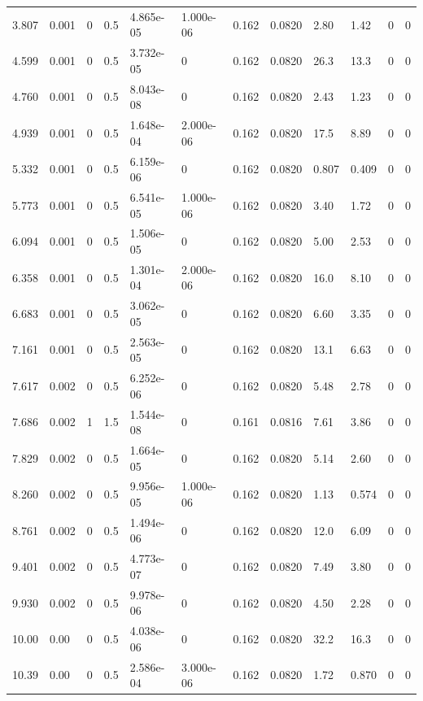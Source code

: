 \documentclass[preview]{standalone}
\begin{document}
{{\begin{tabular}{L{1.2cm}C{1.2cm} C{0.3cm}C{0.5cm} C{1.4cm}C{1.4cm} C{1.4cm}C{1.4cm} C{1.6cm}C{1.6cm} C{1.6cm}C{1.6cm}}
  3.807  &  0.001  & 0     & 0.5 &  4.865e-05  & 1.000e-06  &  0.162&   0.0820& 2.80 & 1.42   &  0 & 0  \\ 
  4.599  &  0.001  & 0     & 0.5 &  3.732e-05  & 0  &  0.162&   0.0820& 26.3 & 13.3   &  0 & 0  \\ 
  4.760  &  0.001  & 0     & 0.5 &  8.043e-08  & 0  &  0.162&   0.0820& 2.43 & 1.23   &  0 & 0  \\ 
  4.939  &  0.001  & 0     & 0.5 &  1.648e-04  & 2.000e-06  &  0.162&   0.0820& 17.5 & 8.89   &  0 & 0  \\ 
  5.332  &  0.001  & 0     & 0.5 &  6.159e-06  & 0  &  0.162&   0.0820& 0.807 & 0.409   &  0 & 0  \\ 
  5.773  &  0.001  & 0     & 0.5 &  6.541e-05  & 1.000e-06  &  0.162&   0.0820& 3.40 & 1.72   &  0 & 0  \\ 
  6.094  &  0.001  & 0     & 0.5 &  1.506e-05  & 0  &  0.162&   0.0820& 5.00 & 2.53   &  0 & 0  \\ 
  6.358  &  0.001  & 0     & 0.5 &  1.301e-04  & 2.000e-06  &  0.162&   0.0820& 16.0 & 8.10   &  0 & 0  \\ 
  6.683  &  0.001  & 0     & 0.5 &  3.062e-05  & 0  &  0.162&   0.0820& 6.60 & 3.35   &  0 & 0  \\ 
  7.161  &  0.001  & 0     & 0.5 &  2.563e-05  & 0  &  0.162&   0.0820& 13.1 & 6.63   &  0 & 0  \\ 
  7.617  &  0.002  & 0     & 0.5 &  6.252e-06  & 0  &  0.162&   0.0820& 5.48 & 2.78   &  0 & 0  \\ 
  7.686  &  0.002  & 1     & 1.5 &  1.544e-08  & 0  &  0.161&   0.0816& 7.61 & 3.86   &  0 & 0  \\ 
  7.829  &  0.002  & 0     & 0.5 &  1.664e-05  & 0  &  0.162&   0.0820& 5.14 & 2.60   &  0 & 0  \\ 
  8.260  &  0.002  & 0     & 0.5 &  9.956e-05  & 1.000e-06  &  0.162&   0.0820& 1.13 & 0.574   &  0 & 0  \\ 
  8.761  &  0.002  & 0     & 0.5 &  1.494e-06  & 0  &  0.162&   0.0820& 12.0 & 6.09   &  0 & 0  \\ 
  9.401  &  0.002  & 0     & 0.5 &  4.773e-07  & 0  &  0.162&   0.0820& 7.49 & 3.80   &  0 & 0  \\ 
  9.930  &  0.002  & 0     & 0.5 &  9.978e-06  & 0  &  0.162&   0.0820& 4.50 & 2.28   &  0 & 0  \\ 
  10.00  &  0.00  & 0     & 0.5 &  4.038e-06  & 0  &  0.162&   0.0820& 32.2 & 16.3   &  0 & 0  \\ 
  10.39  &  0.00  & 0     & 0.5 &  2.586e-04  & 3.000e-06  &  0.162&   0.0820& 1.72 & 0.870   &  0 & 0  \\ 

\end{tabular}}}
\end{document}
